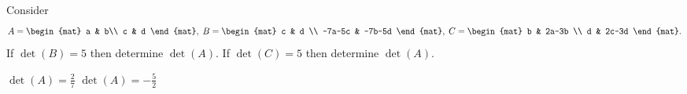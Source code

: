 
\begin{Exercise}[
name={},
title={}, 
difficulty=0,
origin={\cite{YL}}]
Consider
\[
A=
\begin{mat}
a & b\\
c & d 
\end{mat},\;
B=
\begin{mat}
c & d \\
-7a-5c & -7b-5d 
\end{mat},\;
C=
\begin{mat}
b & 2a-3b \\
d & 2c-3d
\end{mat}.
\]
\Question If $\det(B)=5$ then determine $\det(A)$.
\Question If $\det(C)=5$ then determine $\det(A)$.

\end{Exercise}

\begin{Answer}
\begin{multicols}{2}
\Question $\det(A)=\frac{2}{7}$
\Question $\det(A)=-\frac{5}{2}$
\EndCurrentQuestion
\end{multicols}
\end{Answer}
